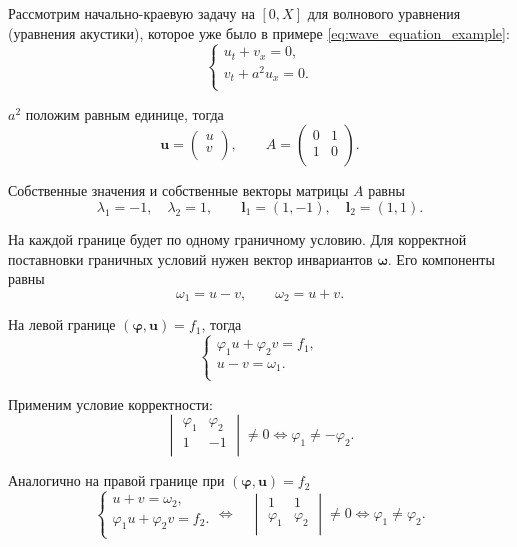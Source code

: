 \documentclass{article}
\begin{document}
\begin{example}\label{eq:boundary_problem_example}
	Рассмотрим начально-краевую задачу на $[0,X]$ для волнового уравнения
	(уравнения акустики), которое уже было в примере
	\eqref{eq:wave_equation_example}:
	\[\begin{cases}
		u_t+v_x=0, \\
		v_t+a^2u_x=0. \\
	\end{cases}\]

	$a^2$ положим равным единице, тогда
	\[\boldsymbol{u}=
		\begin{pmatrix}
			u \\
			v \\
		\end{pmatrix},
	\qquad
	A=
		\begin{pmatrix}
			0 & 1 \\
			1 & 0 \\
		\end{pmatrix}.
	\]

	Собственные значения и собственные векторы матрицы $A$ равны
	\[\lambda_1=-1,\quad \lambda_2=1,\qquad
	\boldsymbol{l}_1=(1,-1),\quad \boldsymbol{l}_2=(1,1).\]

	На каждой границе будет по одному граничному условию. Для корректной
	поставновки граничных условий нужен вектор инвариантов
	$\boldsymbol\omega$. Его компоненты равны
	\[\omega_1=u-v,\qquad \omega_2=u+v.\]

	На левой границе $(\boldsymbol\varphi,\boldsymbol u)=f_1$, тогда
	\[
		\begin{cases}
			\varphi_1 u+\varphi_2 v=f_1, \\
			u-v=\omega_1. \\
		\end{cases}
	\]

	Применим условие корректности:
	\[
		\begin{vmatrix}
			\varphi_1 & \varphi_2 \\
			1	& -1	\\
		\end{vmatrix}
		\ne 0\Leftrightarrow
		\varphi_1\ne -\varphi_2.
	\]

	Аналогично на правой границе при $(\boldsymbol\varphi,\boldsymbol u)=
	f_2$
	\[
		\begin{cases}
			u+v=\omega_2, \\
			\varphi_1 u+\varphi_2 v=f_2. \\
		\end{cases}
		\Leftrightarrow\quad
		\begin{vmatrix}
			1	& 1	\\
			\varphi_1 & \varphi_2 \\
		\end{vmatrix}
		\ne 0\Leftrightarrow
		\varphi_1\ne \varphi_2.
	\]
\end{example}
\end{document}
